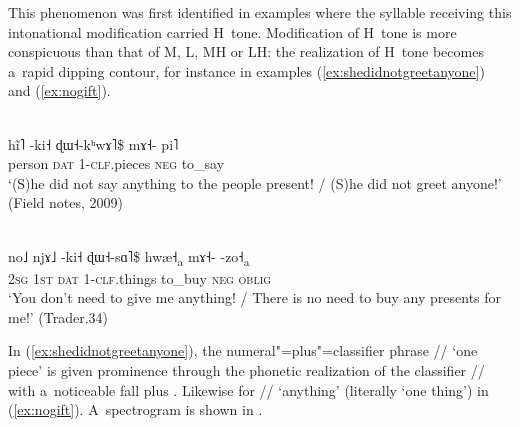 This phenomenon was first identified in examples where the syllable receiving this intonational modification carried H~tone. Modification of H~tone is more conspicuous than that of M, L, MH or LH: the realization of H~tone becomes a~rapid dipping
{contour}, for instance in examples (\ref{ex:shedidnotgreetanyone}) and (\ref{ex:nogift}).

\begin{exe}
  \ex
  \label{ex:shedidnotgreetanyone}
  \\
  \gll hĩ˥		-ki˧	ɖɯ˧-kʰwɤ˥\$		mɤ˧-	pi˥\\
  person	\textsc{dat}	1-\textsc{clf}.pieces	\textsc{neg}	to\_say\\
  \glt ‘(S)he did not say anything to the people present! / (S)he did not greet anyone!’ (Field
  notes, 2009)
\end{exe}

\begin{exe}
	\ex
	\label{ex:nogift}
	\\
	\gll no˩	njɤ˩		-ki˧		ɖɯ˧-sɑ˥\$				hwæ˧\textsubscript{a}		mɤ˧-		-zo˧\textsubscript{a}\\
	\textsc{2sg}	\textsc{1st}	\textsc{dat}	1-\textsc{clf}.things		to\_buy		\textsc{neg}		\textsc{oblig}\\
	\glt ‘You don't need to give me anything! / There is no need to buy any presents for me!’ (Trader.34)
\end{exe}

In (\ref{ex:shedidnotgreetanyone}), the numeral"=plus"=classifier phrase // ‘one piece’ is given {\linebreak}prominence through the phonetic realization of the classifier // with a~noticeable fall plus . Likewise for // ‘anything’ (literally ‘one thing’) in (\ref{ex:nogift}). A~spectrogram is shown in .

